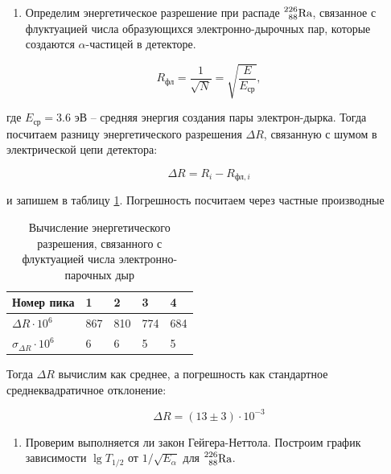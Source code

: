 \documentclass[a4paper,12pt]{article}
\begin{document}
\begin{enumerate}[resume]
    \item Определим энергетическое разрешение при распаде $\prescript{226}{88}{\text{Ra}}$, связанное с флуктуацией числа образующихся электронно-дырочных пар, которые создаются $\alpha$-частицей в детекторе.
\end{enumerate}


\begin{equation}\label{eq:12}
    R_\text{фл} = \frac{1}{\sqrt{N}} = \sqrt{\frac{E}{E_\text{ср}}},
\end{equation}

где $E_\text{ср} = 3.6$ эВ -- средняя энергия создания пары электрон-дырка. Тогда посчитаем разницу энергетического разрешения $\Delta R$, связанную с шумом в электрической цепи детектора:

\begin{equation}
    \Delta R = R_i - R_{\text{фл}, i}
\end{equation}

и запишем в таблицу \ref{table:3}. Погрешность посчитаем через частные производные


\begin{table}[!ht]
    \centering
    \begin{tabular}{|l|l|l|l|l|}
        \hline
        Номер пика & 1   & 2   & 3   & 4   \\ \hline
        $\Delta R \cdot 10^6$          & 867 & 810 & 774 & 684 \\ \hline
        $\sigma_{\Delta R} \cdot 10^6$ & 6   & 6   & 5   & 5   \\ \hline
    \end{tabular}
    \caption{Вычисление энергетического разрешения, связанного с флуктуацией числа электронно-парочных дыр}
    \label{table:3}
\end{table}

Тогда $\Delta R$ вычислим как среднее, а погрешность как стандартное среднеквадратичное отклонение:

\begin{equation*}
    \Delta R = (13 \pm 3) \cdot 10^{-3}
\end{equation*}

\begin{enumerate}[resume]
    \item Проверим выполняется ли закон Гейгера-Неттола. Построим график зависимости $\lg{T_{1/2}}$ от $1 / \sqrt{E_\alpha}$ для $\prescript{226}{88}{\text{Ra}}$.
\end{enumerate}
\end{document}

